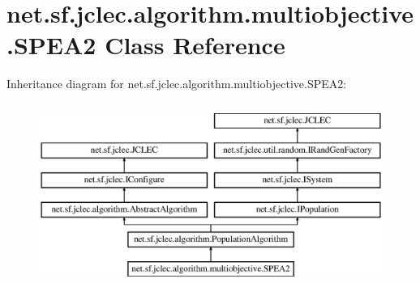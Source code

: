 \hypertarget{classnet_1_1sf_1_1jclec_1_1algorithm_1_1multiobjective_1_1_s_p_e_a2}{\section{net.\-sf.\-jclec.\-algorithm.\-multiobjective.\-S\-P\-E\-A2 Class Reference}
\label{classnet_1_1sf_1_1jclec_1_1algorithm_1_1multiobjective_1_1_s_p_e_a2}
}
Inheritance diagram for net.\-sf.\-jclec.\-algorithm.\-multiobjective.\-S\-P\-E\-A2\-:\begin{figure}[H]
\begin{center}
\leavevmode
\includegraphics[height=6.000000cm]{classnet_1_1sf_1_1jclec_1_1algorithm_1_1multiobjective_1_1_s_p_e_a2}
\end{center}
\end{figure}
